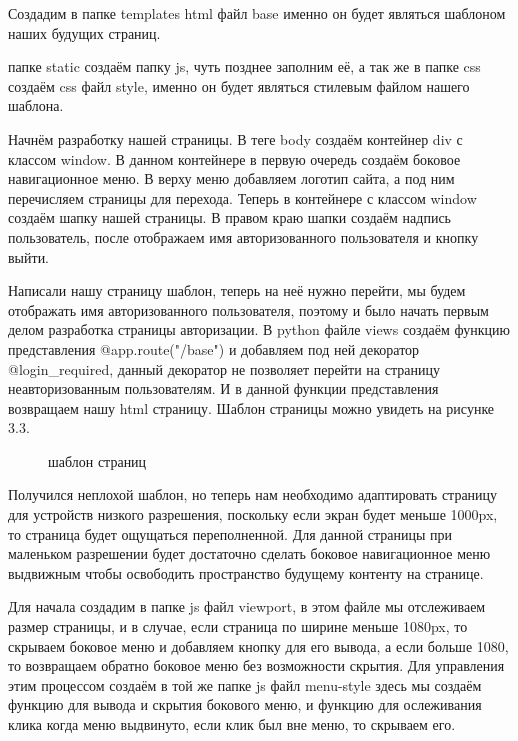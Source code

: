 \documentclass[12pt, oldlfont, amsfonts]{report}
\begin{document}
Создадим в папке { templates} html файл { base} именно он будет являться шаблоном наших будущих страниц. 

  папке static создаём папку { js}, чуть позднее заполним её, а так же в папке { css} создаём css файл { style}, именно он будет являться стилевым файлом нашего шаблона.

Начнём разработку нашей страницы. В теге { body} создаём контейнер { div} с классом { window}. В данном контейнере в первую очередь создаём боковое навигационное меню. В верху меню добавляем логотип сайта, а под ним перечисляем страницы для перехода. Теперь в контейнере с классом { window} создаём шапку нашей страницы. В правом краю шапки создаём надпись пользователь, после отображаем имя авторизованного пользователя и кнопку выйти.

Написали нашу страницу шаблон, теперь на неё нужно перейти, мы будем отображать имя авторизованного пользователя, поэтому и было начать первым делом разработка страницы авторизации. В python файле { views} создаём функцию представления { @app.route("/base")} и добавляем под ней декоратор { @login\_required}, данный декоратор не позволяет перейти на страницу неавторизованным пользователям. И в данной функции представления возвращаем нашу html страницу. Шаблон страницы можно увидеть на рисунке 3.3.

\begin{figure}[h!]
\caption{шаблон страниц}
\end{figure}

Получился неплохой шаблон, но теперь нам необходимо адаптировать страницу для устройств низкого разрешения, поскольку если экран будет меньше 1000px, то страница будет ощущаться переполненной. Для данной страницы при маленьком разрешении будет достаточно сделать боковое навигационное меню выдвижным чтобы освободить пространство будущему контенту на странице.

Для начала создадим в папке { js} файл { viewport}, в этом файле мы отслеживаем размер страницы, и в случае, если страница по ширине меньше 1080px, то скрываем боковое меню и добавляем кнопку для его вывода, а если больше 1080, то возвращаем обратно боковое меню без возможности скрытия. Для управления этим процессом создаём в той же папке js файл { menu-style} здесь мы создаём функцию для вывода и скрытия бокового меню, и функцию для ослеживания клика когда меню выдвинуто, если клик был вне меню, то скрываем его.  
\end{document}
